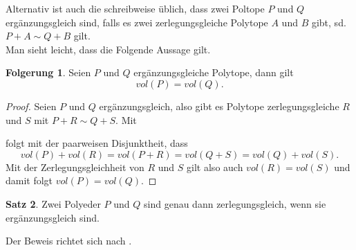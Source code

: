 \documentclass[11pt,titlepage]{article}
\theoremstyle{definition}
\newtheorem{theorem}{Satz}[section]
\newtheorem{corollary}[theorem]{Folgerung}
\theoremstyle{remark}
\begin{document}
	Alternativ ist auch die schreibweise üblich, dass zwei Poltope $P$ und $Q$
	ergänzungsgleich sind, falls es zwei zerlegungsgleiche Polytope 
	$A$ und $B$ gibt, sd. $P+A\sim Q+B$ gilt. \\
	Man sieht leicht, dass die Folgende Aussage gilt.
	
	\begin{corollary}\label{coroll:ergvol}
		Seien $P$ und $Q$ ergänzungsgleiche Polytope, dann gilt
		\[vol(P)=vol(Q).\]
	\end{corollary}
	
	\begin{proof}
		Seien $P$ und $Q$ ergänzungsgleich, also gibt es Polytope 
		zerlegungsgleiche $R$ und $S$ mit $P+R\sim Q+S$. Mit
		
		
		folgt mit der paarweisen Disjunktheit, dass 
		\[vol(P)+vol(R)=vol(P+R)=vol(Q+S)=vol(Q)+vol(S).\]
		Mit der Zerlegungsgleichheit von $R$ und $S$ gilt also auch $vol(R)=vol(S)$ 
		und damit folgt $vol(P)=vol(Q)$.
	\end{proof}
	
	\begin{theorem}
		Zwei Polyeder $P$ und $Q$ sind genau dann zerlegungsgleich, wenn sie 
		ergänzungsgleich sind.
	\end{theorem}
	
	Der Beweis richtet sich nach \cite[Satz III]{Hadwiger}.
	
\end{document}
